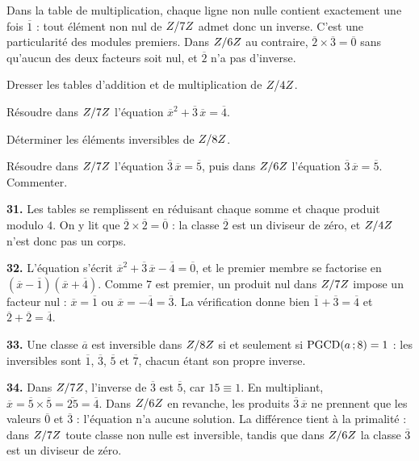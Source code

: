 \begin{exemple}
Dans la table de multiplication, chaque ligne non nulle contient exactement une
fois $\overline1$ : tout élément non nul de $Z/7Z$ admet donc un inverse.
C'est une particularité des modules premiers. Dans $Z/6Z$ au contraire,
$\overline2 \times \overline3 = \overline0$ sans qu'aucun des deux facteurs
soit nul, et $\overline2$ n'a pas d'inverse.
\end{exemple}

\begin{entrainement}
\exo[\niveau{1}] Dresser les tables d'addition et de multiplication de
$Z/4Z$.

\exo[\niveau{2}] Résoudre dans $Z/7Z$ l'équation
$\overline x^{2}+\overline3\,\overline x = \overline4$.

\exo[\niveau{2}] Déterminer les éléments inversibles de $Z/8Z$.

\exo[\niveau{3}] Résoudre dans $Z/7Z$ l'équation
$\overline3\,\overline x = \overline5$, puis dans $Z/6Z$ l'équation
$\overline3\,\overline x = \overline5$. Commenter.
\end{entrainement}

\begin{corrige}
\textbf{31.} Les tables se remplissent en réduisant chaque somme et chaque
produit modulo $4$. On y lit que $\overline2 \times \overline2 = \overline0$ :
la classe $\overline2$ est un diviseur de zéro, et $Z/4Z$ n'est donc pas un
corps.

\textbf{32.} L'équation s'écrit
$\overline x^{2}+\overline3\,\overline x-\overline4 = \overline0$, et le
premier membre se factorise en
$\left(\overline x-\overline1\right)\left(\overline x+\overline4\right)$.
Comme $7$ est premier, un produit nul dans $Z/7Z$ impose un facteur nul :
$\overline x = \overline1$ ou $\overline x = -\overline4 = \overline3$. La
vérification donne bien $\overline1+\overline3 = \overline4$ et
$\overline2+\overline2 = \overline4$.

\textbf{33.} Une classe $\overline a$ est inversible dans $Z/8Z$ si et
seulement si $\operatorname{PGCD}(a\,;8) = 1$ : les inversibles sont $\overline1$,
$\overline3$, $\overline5$ et $\overline7$, chacun étant son propre inverse.

\textbf{34.} Dans $Z/7Z$, l'inverse de $\overline3$ est $\overline5$, car
$15 \equiv 1$. En multipliant, $\overline x = \overline5\times\overline5
= \overline{25} = \overline4$. Dans $Z/6Z$ en revanche, les produits
$\overline3\,\overline x$ ne prennent que les valeurs $\overline0$ et
$\overline3$ : l'équation n'a aucune solution. La différence tient à la
primalité : dans $Z/7Z$ toute classe non nulle est inversible, tandis que dans
$Z/6Z$ la classe $\overline3$ est un diviseur de zéro.
\end{corrige}


